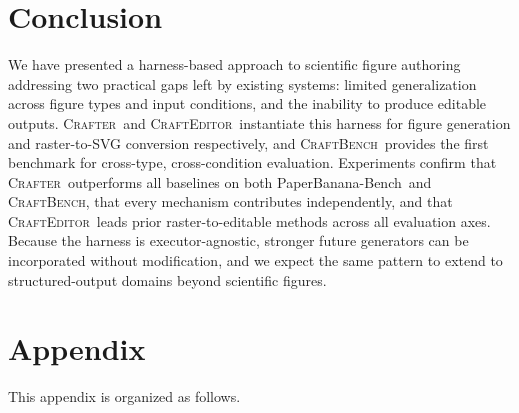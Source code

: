 \documentclass{llmxive}
\providecommand{\Crafter}{\textsc{Crafter}\xspace}
\providecommand{\Editor}{\textsc{CraftEditor}\xspace}
\providecommand{\CrafterBench}{\textsc{CraftBench}\xspace}
\providecommand{\PaperBananaBench}{PaperBanana-Bench\xspace}
\providecommand{\thefigure}{A\arabic{figure}}
\providecommand{\thetable}{A\arabic{table}}
\begin{document}
\section{Conclusion}
\label{sec:conclusion}

We have presented a harness-based approach to scientific figure authoring addressing two practical gaps left by existing systems: limited generalization across figure types and input conditions, and the inability to produce editable outputs. \Crafter\ and \Editor\ instantiate this harness for figure generation and raster-to-SVG conversion respectively, and \CrafterBench\ provides the first benchmark for cross-type, cross-condition evaluation. Experiments confirm that \Crafter\ outperforms all baselines on both \PaperBananaBench\ and \CrafterBench, that every mechanism contributes independently, and that \Editor\ leads prior raster-to-editable methods across all evaluation axes. Because the harness is executor-agnostic, stronger future generators can be incorporated without modification, and we expect the same pattern to extend to structured-output domains beyond scientific figures.


% 



\appendix
{}
\renewcommand{\thefigure}{A\arabic{figure}}
\renewcommand{\thetable}{A\arabic{table}}
\setcounter{figure}{0}
\setcounter{table}{0}

\section{Appendix}
\noindent This appendix is organized as follows.
\end{document}
